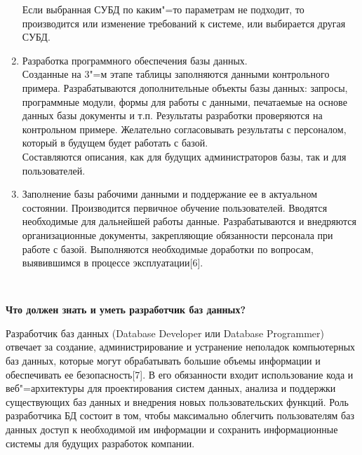 \begin{flushleft}
\begin{enumerate}
        Если выбранная СУБД по каким"=то параметрам не подходит, то производится 
        или изменение требований к системе, или выбирается другая СУБД.
        
        \item Разработка программного обеспечения базы данных. \\
        Созданные на 3"=м этапе таблицы заполняются данными контрольного примера. 
        Разрабатываются дополнительные объекты базы данных: запросы, программные 
        модули, формы для работы с данными, печатаемые на основе данных базы 
        документы и т.п. Результаты разработки проверяются на контрольном примере. 
        Желательно согласовывать результаты с персоналом, который в будущем будет работать с базой.\\
        Составляются описания, как для будущих администраторов базы, так и для пользователей.
        \item Заполнение базы рабочими данными и поддержание ее в актуальном состоянии.
        Производится первичное обучение пользователей. Вводятся необходимые для дальнейшей работы данные. 
        Разрабатываются и внедряются организационные документы, закрепляющие обязанности персонала при 
        работе с базой. Выполняются необходимые доработки по вопросам, выявившимся в процессе эксплуатации[6].
    \end{enumerate}\
    

\newpage
    \begin{center}
        \textbf{Что должен знать и уметь разработчик баз данных?}
    \end{center}
    \vspace*{14pt}

    Разработчик баз данных (Database Developer или Database Programmer) отвечает за создание, 
    администрирование и устранение неполадок компьютерных баз данных, которые могут обрабатывать 
    большие объемы информации и обеспечивать ее безопасность[7]. В его обязанности входит 
    использование кода и веб"=архитектуры для проектирования систем данных, анализа и поддержки 
    существующих баз данных и внедрения новых пользовательских функций. Роль разработчика 
    БД состоит в том, чтобы максимально облегчить пользователям баз данных доступ к необходимой
    им информации и сохранить информационные системы для будущих разработок компании.\\


\end{flushleft}
